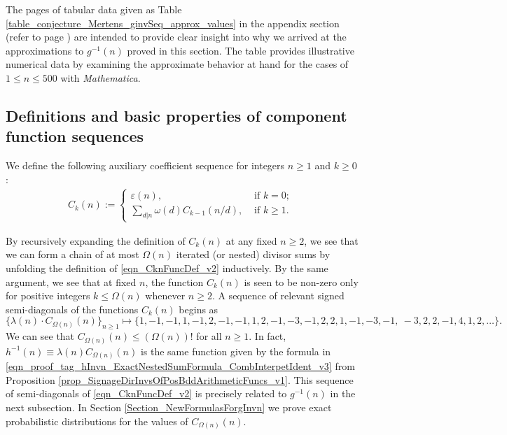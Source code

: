 \documentclass[11pt,reqno,a4letter]{article}
\numberwithin{figure}{section}
\numberwithin{table}{section}
\newcommand{\seqnum}[1]{\href{http://oeis.org/#1}{\color{ProcessBlue}{\underline{#1}}}}
\theoremstyle{plain}
\numberwithin{theorem}{section}
\theoremstyle{definition}
\begin{document}
The pages of tabular data given as Table \ref{table_conjecture_Mertens_ginvSeq_approx_values} 
in the appendix section (refer to 
page \pageref{table_conjecture_Mertens_ginvSeq_approx_values}) are intended to 
provide clear insight into why we arrived at the approximations to 
$g^{-1}(n)$ proved in this section. The table provides illustrative 
numerical data by examining the approximate behavior 
at hand for the cases of $1 \leq n \leq 500$ with \emph{Mathematica}. 

\subsection{Definitions and basic properties of component function sequences} 

We define the following auxiliary coefficient sequence for integers $n \geq 1$ and $k \geq 0$: 
\begin{align} 
\label{eqn_CknFuncDef_v2} 
C_k(n) := \begin{cases} 
     \varepsilon(n), & \text{ if $k = 0$; } \\ 
     \sum\limits_{d|n} \omega(d) C_{k-1}(n/d), & \text{ if $k \geq 1$. } 
     \end{cases} 
\end{align} 

By recursively expanding the definition of $C_k(n)$ 
at any fixed $n \geq 2$, we see that 
we can form a chain of at most $\Omega(n)$ iterated (or nested) divisor sums by 
unfolding the definition of \eqref{eqn_CknFuncDef_v2} inductively. 
By the same argument, we see that at fixed $n$, the function 
$C_k(n)$ is seen to be non-zero only for positive integers 
$k \leq \Omega(n)$ whenever $n \geq 2$. 
A sequence of relevant signed semi-diagonals of the functions $C_k(n)$ begins as 
\cite[\seqnum{A008480}]{OEIS} 
\[
\{\lambda(n) \cdot C_{\Omega(n)}(n) \}_{n \geq 1} \mapsto \{
     1, -1, -1, 1, -1, 2, -1, -1, 1, 2, -1, -3, -1, 2, 2, 1, -1, -3, -1, \
     -3, 2, 2, -1, 4, 1, 2, \ldots \}. 
\]
We can see that $C_{\Omega(n)}(n) \leq (\Omega(n))!$ for all $n \geq 1$. In fact, 
$h^{-1}(n) \equiv \lambda(n) C_{\Omega(n)}(n)$ is the same function given by 
the formula in \eqref{eqn_proof_tag_hInvn_ExactNestedSumFormula_CombInterpetIdent_v3} from 
Proposition \ref{prop_SignageDirInvsOfPosBddArithmeticFuncs_v1}. 
This sequence of semi-diagonals of 
\eqref{eqn_CknFuncDef_v2} 
is precisely related to $g^{-1}(n)$ in the next subsection. 
In Section \ref{Section_NewFormulasForgInvn} 
we prove exact probabilistic distributions for the values of 
$C_{\Omega(n)}(n)$. 
\end{document}
